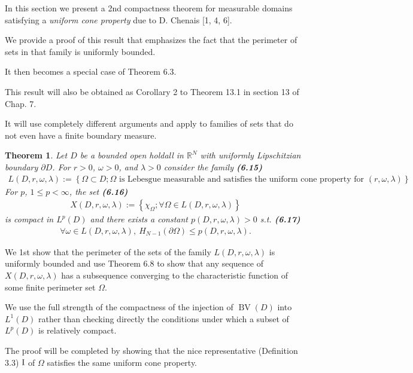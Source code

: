 \documentclass{book}
\numberwithin{equation}{section}
\newtheorem{theorem}{Theorem}[section]
\begin{document}
\begin{enumerate}
    In this section we present a 2nd compactness theorem for measurable domains satisfying a \textit{uniform cone property} due to D. Chenais [1, 4, 6].
    
    We provide a proof of this result that emphasizes the fact that the perimeter of sets in that family is uniformly bounded.
    
    It then becomes a special case of Theorem 6.3.
    
    This result will also be obtained as Corollary 2 to Theorem 13.1 in section 13 of Chap. 7.
    
    It will use completely different arguments and apply to families of sets that do not even have a finite boundary measure.
    
    \begin{theorem}
        Let $D$ be a bounded open holdall in $\mathbb{R}^N$ with uniformly Lipschitzian
        boundary $\partial D$. For $r > 0$, $\omega > 0$, and $\lambda > 0$ consider the family \textbf{(6.15)}
        \begin{align*}
            L(D,r,\omega,\lambda) := \left\{\Omega\subset D;\Omega \mbox{ is Lebesgue measurable and satisfies the uniform cone property for } (r,\omega,\lambda)\right\}.
        \end{align*}
        For $p$, $1\le p < \infty$, the set \textbf{(6.16)}
        \begin{align*}
            X(D,r,\omega,\lambda) := \left\{\chi_\Omega;\forall\Omega\in L(D,r,\omega,\lambda)\right\}
        \end{align*}
        is compact in $L^p(D)$ and there exists a constant $p(D,r,\omega,\lambda) > 0$ s.t. \textbf{(6.17)}
        \begin{align*}
            \forall\omega\in L(D,r,\omega,\lambda),\ H_{N-1}(\partial\Omega)\le p(D,r,\omega,\lambda).
        \end{align*}
    \end{theorem}
    We 1st show that the perimeter of the sets of the family $L(D,r,\omega,\lambda)$ is uniformly bounded and use Theorem 6.8 to show that any sequence of $X(D,r,\omega,\lambda)$ has a subsequence converging to the characteristic function of some finite perimeter set $\Omega$.
    
    We use the full strength of the compactness of the injection of $\operatorname{BV}(D)$ into $L^1(D)$ rather than checking directly the conditions under which a subset of $L^p(D)$ is relatively compact.
    
    The proof will be completed by showing that the nice representative (Definition 3.3) ${\rm I}$ of $\Omega$ satisfies the same uniform cone property.
    

\end{enumerate}
\end{document}

